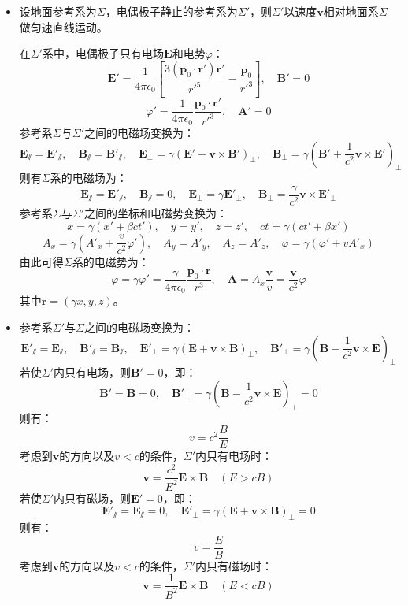 \documentclass[a4paper,fontset=none]{ctexart}
\begin{document}
\begin{itemize}
    \item[12.]
    设地面参考系为$\varSigma$，电偶极子静止的参考系为$\varSigma'$，则$\varSigma'$以速度$\bm{v}$相对地面系$\varSigma$做匀速直线运动。

    在$\varSigma'$系中，电偶极子只有电场$\bm{E}$和电势$\varphi$：
    \[
        \bm{E}' = \frac{1}{4\pi\epsilon_0} \left[\frac{3(\bm{p}_0 \cdot \bm{r}')\bm{r}'}{r'^5} - \frac{\bm{p}_0}{r'^3}\right],\quad \bm{B}' = 0
    \]
    \[
        \varphi' = \frac{1}{4\pi\epsilon_0} \frac{\bm{p}_0 \cdot \bm{r}'}{r'^3},\quad \bm{A}' = 0
    \]
    参考系$\varSigma$与$\varSigma'$之间的电磁场变换为：
    \[
        \bm{E}_\varparallel = \bm{E}'_\varparallel,\quad
        \bm{B}_\varparallel = \bm{B}'_\varparallel,\quad
        \bm{E}_\perp = \gamma(\bm{E}' - \bm{v}\times\bm{B}')_\perp,\quad
        \bm{B}_\perp = \gamma(\bm{B}' + \frac{1}{c^2}\bm{v}\times\bm{E}')_\perp
    \]
    则有$\varSigma$系的电磁场为：
    \[
        \bm{E}_\varparallel = \bm{E}'_\varparallel,\quad \bm{B}_\varparallel = 0,\quad \bm{E}_\perp = \gamma\bm{E}'_\perp,\quad \bm{B}_\perp = \frac{\gamma}{c^2}\bm{v} \times \bm{E}'_\perp
    \]
    参考系$\varSigma$与$\varSigma'$之间的坐标和电磁势变换为：
    \[
        x = \gamma(x'+\beta ct'),\quad y = y',\quad z = z',\quad ct = \gamma(ct'+\beta x')
    \]
    \[
        A_x = \gamma\left(A'_x+\frac{v}{c^2}\varphi'\right),\quad A_y = A'_y,\quad A_z = A'_z,\quad \varphi = \gamma(\varphi'+vA'_x)
    \]
    由此可得$\varSigma$系的电磁势为：
    \[
        \varphi = \gamma\varphi' = \frac{\gamma}{4\pi\epsilon_0}\frac{\bm{p}_0 \cdot \bm{r}}{r^3},\quad
        \bm{A} = A_x\frac{\bm{v}}{v} = \frac{\bm{v}}{c^2}\varphi
    \]
    其中$\bm{r}=(\gamma x,y,z)$。

    \item[13.]
    参考系$\varSigma'$与$\varSigma$之间的电磁场变换为：
    \[
        \bm{E}'_\varparallel = \bm{E}_\varparallel,\quad
        \bm{B}'_\varparallel = \bm{B}_\varparallel,\quad
        \bm{E}'_\perp = \gamma(\bm{E} + \bm{v}\times\bm{B})_\perp,\quad
        \bm{B}'_\perp = \gamma(\bm{B} - \frac{1}{c^2}\bm{v}\times\bm{E})_\perp
    \]
    若使$\varSigma'$内只有电场，则$\bm{B}'=0$，即：
    \[
        \bm{B}' = \bm{B} = 0,\quad
        \bm{B}'_\perp = \gamma(\bm{B} - \frac{1}{c^2}\bm{v}\times\bm{E})_\perp = 0
    \]
    则有：
    \[
        v = c^2\frac{B}{E}
    \]
    考虑到$\bm{v}$的方向以及$v<c$的条件，$\varSigma'$内只有电场时：
    \[
        \bm{v} = \frac{c^2}{E^2}\bm{E} \times \bm{B}\quad
        (E > cB)
    \]
    若使$\varSigma'$内只有磁场，则$\bm{E}'=0$，即：
    \[
        \bm{E}'_\varparallel = \bm{E}_\varparallel = 0,\quad
        \bm{E}'_\perp = \gamma(\bm{E} + \bm{v}\times\bm{B})_\perp = 0
    \]
    则有：
    \[
        v = \frac{E}{B}
    \]
    考虑到$\bm{v}$的方向以及$v<c$的条件，$\varSigma'$内只有磁场时：
    \[
        \bm{v} = \frac{1}{B^2}\bm{E} \times \bm{B}\quad
        (E < cB)
    \]


\end{itemize}
\end{document}
